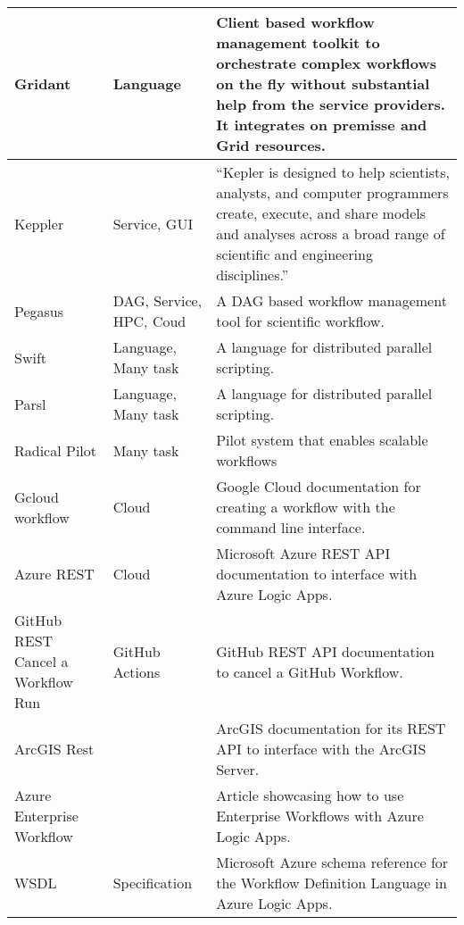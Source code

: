 \begin{table*}[htb]
{{\begin{tabular}{|p{3cm}|p{3cm}|p{10cm}|}
Gridant  \cite{las-2004-gridant} & Language & 
Client based workflow management toolkit to orchestrate complex workflows on the fly without substantial help from the service providers. It integrates on premisse and Grid resources. \\
\hline

Keppler  \cite{www-kepler} & Service, GUI & ``Kepler is designed to help scientists, analysts, and computer programmers create, execute, and share models and analyses across a broad range of scientific and engineering disciplines.'' \\
\hline

Pegasus  \cite{www-pegasus} & DAG, Service, HPC, Coud &  A DAG based workflow management tool for scientific workflow.  \\
\hline

Swift \cite{las-2007-swift} & Language, Many task & A language for distributed parallel scripting.\\
\hline

Parsl \cite{www-parsl} & Language, Many task & A language for distributed parallel scripting. \\
\hline

Radical Pilot \cite{arxiv-radical-pilot} & Many task & Pilot system that enables scalable workflows \\ 
\hline

Gcloud workflow \cite{www-gcloud} & Cloud & Google Cloud documentation for creating a workflow with the command line interface. \\
\hline

Azure REST \cite{www-azure-rest} & Cloud & Microsoft Azure REST API documentation to interface with Azure Logic Apps. \\
\hline

GitHub REST Cancel a Workflow Run \cite{www-github-rest-cancel}
& GitHub Actions
& GitHub REST API documentation to cancel a GitHub Workflow. \\
\hline

ArcGIS Rest \cite{www-arcgis-rest} & & ArcGIS documentation for its REST API to interface with the ArcGIS Server. \\
\hline

Azure Enterprise Workflow \cite{www-azure-enterprise-workflow} & & Article showcasing how to use Enterprise Workflows with Azure Logic Apps. \\
\hline

WSDL \cite{www-wsdl} & Specification & Microsoft Azure schema reference for the Workflow Definition Language in Azure Logic Apps. \\
  \hline


\end{tabular}}}
\end{table*}
